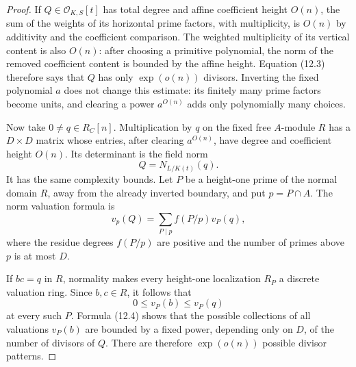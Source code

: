 \documentclass[11pt,reqno]{amsart}
\theoremstyle{definition}
\theoremstyle{remark}
\newcommand{\cO}{\mathcal O}
\begin{document}
\begin{proof}
If \(Q\in\cO_{K,S}[t]\) has total degree and affine coefficient height
\(O(n)\), the sum of the weights of its horizontal prime factors, with
multiplicity, is \(O(n)\) by additivity and the coefficient comparison.
The weighted multiplicity of its vertical content is also \(O(n)\): after
choosing a primitive polynomial, the norm of the removed coefficient content
is bounded by the affine height.  Equation (12.3) therefore says
that \(Q\) has only \(\exp(o(n))\) divisors.  Inverting the fixed polynomial
\(a\) does not change this estimate: its finitely many prime factors become
units, and clearing a power \(a^{O(n)}\) adds only polynomially many choices.

Now take \(0\ne q\in R_C[n]\).  Multiplication by \(q\) on the fixed free
\(A\)-module \(R\) has a \(D\times D\) matrix whose entries, after clearing
\(a^{O(n)}\), have degree and coefficient height \(O(n)\).  Its determinant
is the field norm
\[
 Q=N_{L/K(t)}(q).
\]
It has the same complexity bounds.  Let \(P\) be a height-one prime of the
normal domain \(R\), away from the already inverted boundary, and put
\(p=P\cap A\).  The norm valuation formula is
\[
 v_p(Q)=\sum_{P\mid p}f(P/p)v_P(q),
\tag{12.4}
\]
where the residue degrees \(f(P/p)\) are positive and the number of primes
above \(p\) is at most \(D\).

If \(bc=q\) in \(R\), normality makes every height-one localization
\(R_P\) a discrete valuation ring.  Since \(b,c\in R\), it follows that
\[
 0\le v_P(b)\le v_P(q)
\]
at every such \(P\).  Formula (12.4) shows that the possible collections of
all valuations \(v_P(b)\) are bounded by a fixed power, depending only on
\(D\), of the number of divisors of \(Q\).  There are therefore
\(\exp(o(n))\) possible divisor patterns.


\end{proof}
\end{document}
